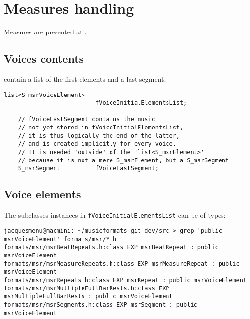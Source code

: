 
\chapter{Measures handling}\label{Measures handling}

Measures are presented at .


\section{Voices contents}

 contain a list of the first elements and a last segment:
\begin{lstlisting}[language=CPlusPlus]
    list<S_msrVoiceElement>
                          fVoiceInitialElementsList;

    // fVoiceLastSegment contains the music
    // not yet stored in fVoiceInitialElementsList,
    // it is thus logically the end of the latter,
    // and is created implicitly for every voice.
    // It is needed 'outside' of the 'list<S_msrElement>'
    // because it is not a mere S_msrElement, but a S_msrSegment
    S_msrSegment          fVoiceLastSegment;
\end{lstlisting}


\section{Voice elements}

The  subclasses instances in {\tt fVoiceInitialElementsList} can be of types:
\begin{lstlisting}[language=Terminal]
jacquesmenu@macmini: ~/musicformats-git-dev/src > grep 'public msrVoiceElement' formats/msr/*.h
formats/msr/msrBeatRepeats.h:class EXP msrBeatRepeat : public msrVoiceElement
formats/msr/msrMeasureRepeats.h:class EXP msrMeasureRepeat : public msrVoiceElement
formats/msr/msrRepeats.h:class EXP msrRepeat : public msrVoiceElement
formats/msr/msrMultipleFullBarRests.h:class EXP msrMultipleFullBarRests : public msrVoiceElement
formats/msr/msrSegments.h:class EXP msrSegment : public msrVoiceElement
\end{lstlisting}

